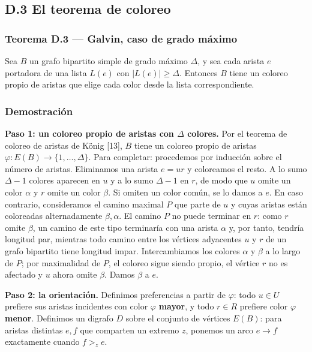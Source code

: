 \documentclass[
  11pt,
]{article}
\begin{document}
\subsection{D.3 El teorema de coloreo}\label{d.3-el-teorema-de-coloreo}

\subsubsection{Teorema D.3 --- Galvin, caso de grado
máximo}\label{teorema-d.3-galvin-caso-de-grado-muxe1ximo}

Sea \(B\) un grafo bipartito simple de grado máximo \(\Delta\), y sea
cada arista \(e\) portadora de una lista \(L(e)\) con
\(|L(e)|\ge\Delta\). Entonces \(B\) tiene un coloreo propio de aristas
que elige cada color desde la lista correspondiente.

\subsubsection{Demostración}\label{demostraciuxf3n-9}

\textbf{Paso 1: un coloreo propio de aristas con \(\Delta\) colores.}
Por el teorema de coloreo de aristas de König {[}13{]}, \(B\) tiene un
coloreo propio de aristas \(\varphi:E(B)\to\{1,\ldots,\Delta\}\). Para
completar: procedemos por inducción sobre el número de aristas.
Eliminamos una arista \(e=ur\) y coloreamos el resto. A lo sumo
\(\Delta-1\) colores aparecen en \(u\) y a lo sumo \(\Delta-1\) en
\(r\), de modo que \(u\) omite un color \(\alpha\) y \(r\) omite un
color \(\beta\). Si omiten un color común, se lo damos a \(e\). En caso
contrario, consideramos el camino maximal \(P\) que parte de \(u\) y
cuyas aristas están coloreadas alternadamente \(\beta,\alpha\). El
camino \(P\) no puede terminar en \(r\): como \(r\) omite \(\beta\), un
camino de este tipo terminaría con una arista \(\alpha\) y, por tanto,
tendría longitud par, mientras todo camino entre los vértices adyacentes
\(u\) y \(r\) de un grafo bipartito tiene longitud impar. Intercambiamos
los colores \(\alpha\) y \(\beta\) a lo largo de \(P\); por maximalidad
de \(P\), el coloreo sigue siendo propio, el vértice \(r\) no es
afectado y \(u\) ahora omite \(\beta\). Damos \(\beta\) a \(e\).

\textbf{Paso 2: la orientación.} Definimos preferencias a partir de
\(\varphi\): todo \(u\in U\) prefiere sus aristas incidentes con color
\(\varphi\) \textbf{mayor}, y todo \(r\in R\) prefiere color \(\varphi\)
\textbf{menor}. Definimos un digrafo \(D\) sobre el conjunto de vértices
\(E(B)\): para aristas distintas \(e,f\) que comparten un extremo \(z\),
ponemos un arco \(e\to f\) exactamente cuando \(f>_ze\).
\end{document}
